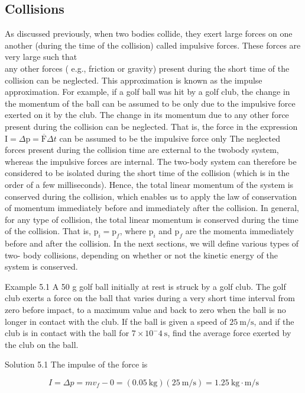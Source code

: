 \documentclass[10pt]{article}
\numberwithin{equation}{section}
\begin{document}
\subsection{Collisions}\label{sec:5-4}
As discussed previously, when two bodies collide, they exert large forces on one another (during the time of the collision) called impulsive forces. These forces are very large such that\\
any other forces ( e.g., friction or gravity) present during the short time of the collision can be neglected. This approximation is known as the impulse approximation. For example, if a golf ball was hit by a golf club, the change in the momentum of the ball can be assumed to be only due to the impulsive force exerted on it by the club. The change in its momentum due to any other force present during the collision can be neglected. That is, the force in the expression $\mathrm{I}=\Delta \mathrm{p}=\overline{\mathrm{F}} \Delta t$ can be assumed to be the impulsive force only The neglected forces present during the collision time are external to the twobody system, whereas the impulsive forces are internal. The two-body system can therefore be considered to be isolated during the short time of the collision (which is in the order of a few milliseconds). Hence, the total linear momentum of the system is conserved during the collision, which enables us to apply the law of conservation of momentum immediately before and immediately after the collision. In general, for any type of collision, the total linear momentum is conserved during the time of the collision. That is, $\mathrm{p}_{i}=\mathrm{p}_{f}$, where $\mathrm{p}_{i}$ and $\mathrm{p}_{f}$ are the momenta immediately before and after the collision. In the next sections, we will define various types of two- body collisions, depending on whether or not the kinetic energy of the system is conserved.

Example 5.1 A 50 g golf ball initially at rest is struck by a golf club. The golf club exerts a force on the ball that varies during a very short time interval from zero before impact, to a maximum value and back to zero when the ball is no longer in contact with the club. If the ball is given a speed of $25 \mathrm{~m} / \mathrm{s}$, and if the club is in contact with the ball for $7 \times 10^{-} 4 \mathrm{~s}$, find the average force exerted by the club on the ball.

Solution 5.1 The impulse of the force is

$$
I=\Delta p=m v_{f}-0=(0.05 \mathrm{~kg})(25 \mathrm{~m} / \mathrm{s})=1.25 \mathrm{~kg} \cdot \mathrm{m} / \mathrm{s}
$$
\end{document}
